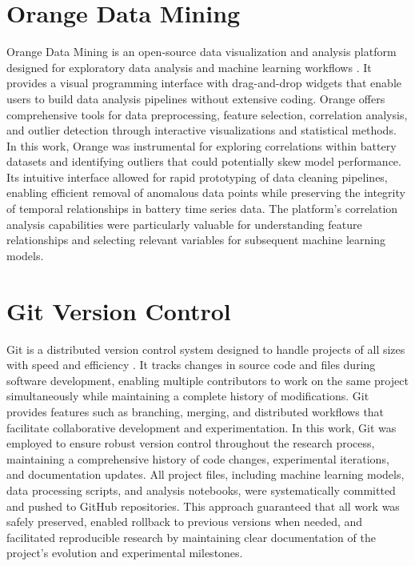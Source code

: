 \section{Orange Data Mining}
Orange Data Mining is an open-source data visualization and analysis platform designed for exploratory data analysis and machine learning workflows \cite{noauthor_biolaborange3_nodate}. It provides a visual programming interface with drag-and-drop widgets that enable users to build data analysis pipelines without extensive coding. Orange offers comprehensive tools for data preprocessing, feature selection, correlation analysis, and outlier detection through interactive visualizations and statistical methods. In this work, Orange was instrumental for exploring correlations within battery datasets and identifying outliers that could potentially skew model performance. Its intuitive interface allowed for rapid prototyping of data cleaning pipelines, enabling efficient removal of anomalous data points while preserving the integrity of temporal relationships in battery time series data. The platform's correlation analysis capabilities were particularly valuable for understanding feature relationships and selecting relevant variables for subsequent machine learning models.

\section{Git Version Control}
Git is a distributed version control system designed to handle projects of all sizes with speed and efficiency \cite{noauthor_git_nodate}. It tracks changes in source code and files during software development, enabling multiple contributors to work on the same project simultaneously while maintaining a complete history of modifications. Git provides features such as branching, merging, and distributed workflows that facilitate collaborative development and experimentation. In this work, Git was employed to ensure robust version control throughout the research process, maintaining a comprehensive history of code changes, experimental iterations, and documentation updates. All project files, including machine learning models, data processing scripts, and analysis notebooks, were systematically committed and pushed to GitHub repositories. This approach guaranteed that all work was safely preserved, enabled rollback to previous versions when needed, and facilitated reproducible research by maintaining clear documentation of the project's evolution and experimental milestones.

